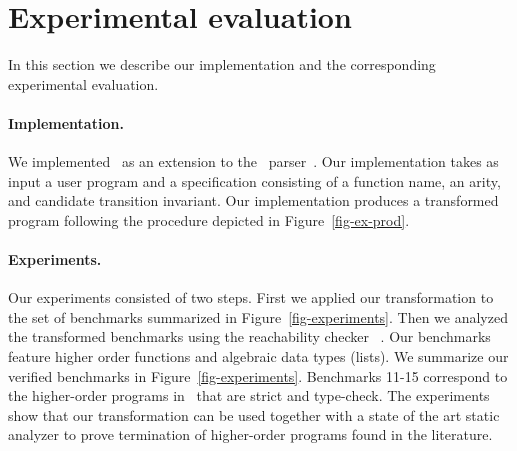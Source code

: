 \section{Experimental evaluation}
\label{sec-experiments}

In this section we describe our implementation and the corresponding
experimental evaluation.

\paragraph{Implementation.}
We implemented \product\ as an extension to the \camlp\
parser~\cite{Camlp4-dist}. Our implementation takes as input a user
program and a specification consisting of a function name, an arity,
and candidate transition invariant. Our implementation produces a
transformed program following the procedure depicted in
Figure~\ref{fig-ex-prod}.

\paragraph{Experiments.}

Our experiments consisted of two steps. First we applied our
transformation to the set of benchmarks summarized in
Figure~\ref{fig-experiments}. Then we analyzed the transformed
benchmarks using the reachability checker \dsolve~\cite{Dsolve, DsolveCAV}.
Our benchmarks feature higher order functions and algebraic
data types (lists).  We summarize our verified benchmarks in
Figure~\ref{fig-experiments}.
Benchmarks 11-15 correspond to the higher-order programs
in~\cite{Sereni05terminationanalysis} that are strict and
\mbox{type-check}.
The experiments show that our transformation can be used together with a state of
the art static analyzer to prove termination of higher-order programs found
in the literature.




